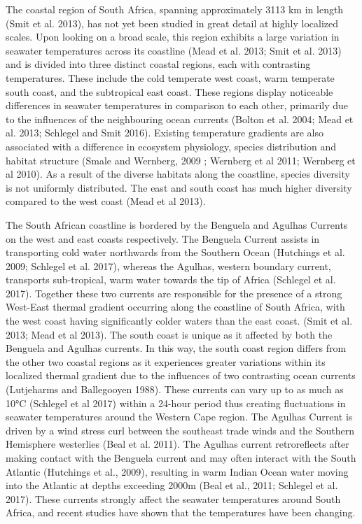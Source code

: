 \documentclass[12pt,]{article}
\begin{document}
The coastal region of South Africa, spanning approximately 3113 km in
length (Smit et al. 2013), has not yet been studied in great detail at
highly localized scales. Upon looking on a broad scale, this region
exhibits a large variation in seawater temperatures across its coastline
(Mead et al. 2013; Smit et al. 2013) and is divided into three distinct
coastal regions, each with contrasting temperatures. These include the
cold temperate west coast, warm temperate south coast, and the
subtropical east coast. These regions display noticeable differences in
seawater temperatures in comparison to each other, primarily due to the
influences of the neighbouring ocean currents (Bolton et al. 2004; Mead
et al. 2013; Schlegel and Smit 2016). Existing temperature gradients are
also associated with a difference in ecosystem physiology, species
distribution and habitat structure (Smale and Wernberg, 2009 ; Wernberg
et al 2011; Wernberg et al 2010). As a result of the diverse habitats
along the coastline, species diversity is not uniformly distributed. The
east and south coast has much higher diversity compared to the west
coast (Mead et al 2013).

The South African coastline is bordered by the Benguela and Agulhas
Currents on the west and east coasts respectively. The Benguela Current
assists in transporting cold water northwards from the Southern Ocean
(Hutchings et al. 2009; Schlegel et al. 2017), whereas the Agulhas,
western boundary current, transports sub-tropical, warm water towards
the tip of Africa (Schlegel et al. 2017). Together these two currents
are responsible for the presence of a strong West-East thermal gradient
occurring along the coastline of South Africa, with the west coast
having significantly colder waters than the east coast. (Smit et al.
2013; Mead et al 2013). The south coast is unique as it affected by both
the Benguela and Agulhas currents. In this way, the south coast region
differs from the other two coastal regions as it experiences greater
variations within its localized thermal gradient due to the influences
of two contrasting ocean currents (Lutjeharms and Ballegooyen 1988).
These currents can vary up to as much as 10°C (Schlegel et al 2017)
within a 24-hour period thus creating fluctuations in seawater
temperatures around the Western Cape region. The Agulhas Current is
driven by a wind stress curl between the southeast trade winds and the
Southern Hemisphere westerlies (Beal et al. 2011). The Agulhas current
retroreflects after making contact with the Benguela current and may
often interact with the South Atlantic (Hutchings et al., 2009),
resulting in warm Indian Ocean water moving into the Atlantic at depths
exceeding 2000m (Beal et al., 2011; Schlegel et al. 2017). These
currents strongly affect the seawater temperatures around South Africa,
and recent studies have shown that the temperatures have been changing.
\end{document}
